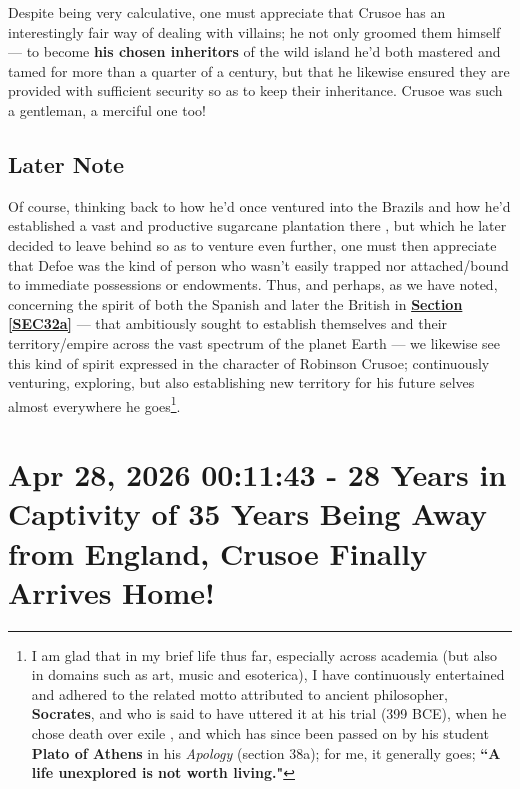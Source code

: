 \documentclass[a4paper]{article}
\begin{document}
Despite being very calculative, one must appreciate that Crusoe has an interestingly fair way of dealing with villains; he not only groomed them himself --- to become \textbf{his chosen inheritors} of the wild island he'd both mastered and tamed for more than a quarter of a century, but that he likewise ensured they are provided with sufficient security so as to keep their inheritance. Crusoe was such a gentleman, a merciful one too!


\subsection{Later Note}


Of course, thinking back to how he'd once ventured into the Brazils and how he'd established a vast and productive sugarcane plantation there \cite{Defoe2007}, but which he later decided to leave behind so as to venture even further, one must then appreciate that Defoe was the kind of person who wasn't easily trapped nor attached/bound to immediate possessions or endowments. Thus, and perhaps, as we have noted, concerning the spirit of both the Spanish and later the British in \textbf{\hyperref[SEC32a]{Section \ref{SEC32a}}} --- that ambitiously sought to establish themselves and their territory/empire across the vast spectrum of the planet Earth --- we likewise see this kind of spirit expressed in the character of Robinson Crusoe; continuously venturing, exploring, but also establishing new territory for his future selves almost everywhere he goes\footnote{I am glad that in my brief life thus far, especially across academia (but also in domains such as art, music and esoterica), I have continuously entertained and adhered to the related motto attributed to ancient philosopher, \textbf{Socrates}, and who is said to have uttered it at his trial (399 BCE), when he chose death over exile \cite{copilot_assistant}, and which  has since been passed on by his student \textbf{Plato of Athens} in his \textit{Apology} (section 38a); for me, it generally goes; \textbf{``A life unexplored is not worth living."}}.





\section{Apr 28, 2026 00:11:43 - 28 Years in Captivity of 35 Years Being Away from England, Crusoe Finally Arrives Home!}
\label{SEC69}
\end{document}
